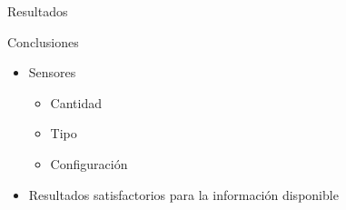 \documentclass[spanish]{beamer}
\begin{document}
\begin{frame}{Resultados}
\end{frame}

\begin{frame}{Conclusiones}
  \begin{itemize}
  \item Sensores
    \begin{itemize}
    \item Cantidad
    \item Tipo
    \item Configuración
    \end{itemize}
  \item Resultados satisfactorios para la información disponible
  \end{itemize}
\end{frame}
\end{document}
